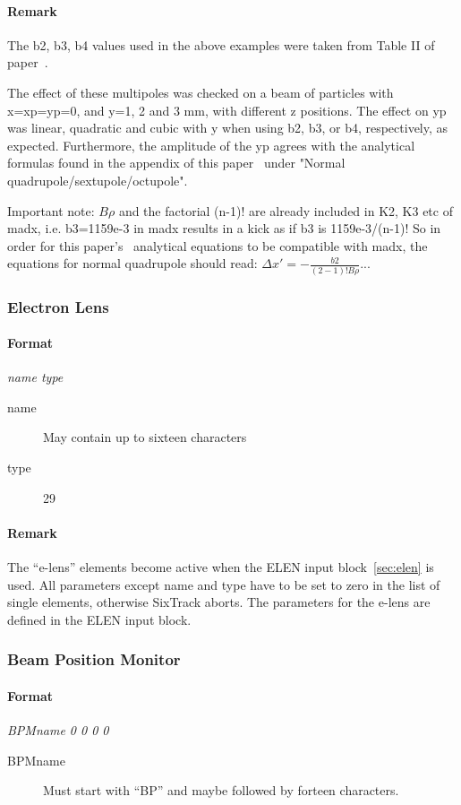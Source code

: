 \documentclass[a4paper,11pt]{report}
\begin{document}
\paragraph{Remark}
The b2, b3, b4 values used in the above examples were taken from Table II of paper~\cite{RFmultsPaper}.

The effect of these multipoles was checked on a beam of particles with x=xp=yp=0, and y=1, 2 and 3 mm, with different z positions.
The effect on yp was linear, quadratic and cubic with y when using b2, b3, or b4, respectively, as expected. 
Furthermore, the amplitude of the yp agrees with the analytical formulas found in the appendix of this paper~\cite{RFmultsPaper} under "Normal quadrupole/sextupole/octupole". 

Important note: $B\rho$ and the factorial (n-1)! are already included in K2, K3 etc of madx,
i.e. b3=1159e-3 in madx results in a kick as if b3 is 1159e-3/(n-1)!
So in order for this paper's~\cite{RFmultsPaper} analytical equations to be compatible with madx, the equations for normal quadrupole should read: 
$\Delta x'=-\frac{b2}{(2-1)!B\rho}...$


\subsubsection{Electron Lens} \label{ELEN}
\paragraph{Format} {\em name type}
\begin{description}
	\item [name] May contain up to sixteen characters
	\item [type] 29
\end{description}

\paragraph{Remark}
The ``e-lens'' elements become active when the
ELEN input block~\ref{sec:elen} is used. All parameters except name and type have to be set to zero in the list of single elements, otherwise SixTrack aborts. The parameters for the e-lens are defined in the ELEN input block.

\subsubsection{Beam Position Monitor} \label{BPM}
\paragraph{Format} {\em BPMname 0 0 0 0}
\begin{description}
\item [BPMname] Must start with ``BP'' and maybe followed by forteen characters.
\end{description}
\end{document}
